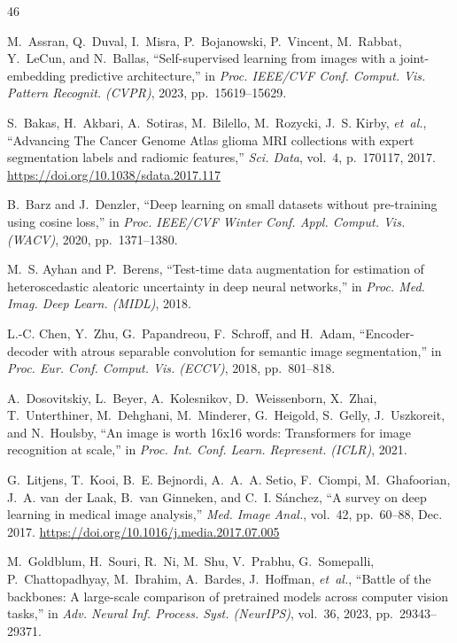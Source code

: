\documentclass[journal]{IEEEtran}
\providecommand{\doi}[1]{\url{https://doi.org/#1}}
\begin{document}
\begin{thebibliography}{46}

M.~Assran, Q.~Duval, I.~Misra, P.~Bojanowski, P.~Vincent, M.~Rabbat, Y.~LeCun, and N.~Ballas, ``Self-supervised learning from images with a joint-embedding predictive architecture,'' in \emph{Proc. IEEE/CVF Conf. Comput. Vis. Pattern Recognit. (CVPR)}, 2023, pp.~15619--15629.

S.~Bakas, H.~Akbari, A.~Sotiras, M.~Bilello, M.~Rozycki, J.~S. Kirby, \emph{et~al.}, ``Advancing The Cancer Genome Atlas glioma MRI collections with expert segmentation labels and radiomic features,'' \emph{Sci. Data}, vol.~4, p.~170117, 2017. \doi{10.1038/sdata.2017.117}

B.~Barz and J.~Denzler, ``Deep learning on small datasets without pre-training using cosine loss,'' in \emph{Proc. IEEE/CVF Winter Conf. Appl. Comput. Vis. (WACV)}, 2020, pp.~1371--1380.

M.~S. Ayhan and P.~Berens, ``Test-time data augmentation for estimation of heteroscedastic aleatoric uncertainty in deep neural networks,'' in \emph{Proc. Med. Imag. Deep Learn. (MIDL)}, 2018.

L.-C. Chen, Y.~Zhu, G.~Papandreou, F.~Schroff, and H.~Adam, ``Encoder-decoder with atrous separable convolution for semantic image segmentation,'' in \emph{Proc. Eur. Conf. Comput. Vis. (ECCV)}, 2018, pp.~801--818.

A.~Dosovitskiy, L.~Beyer, A.~Kolesnikov, D.~Weissenborn, X.~Zhai, T.~Unterthiner, M.~Dehghani, M.~Minderer, G.~Heigold, S.~Gelly, J.~Uszkoreit, and N.~Houlsby, ``An image is worth 16x16 words: Transformers for image recognition at scale,'' in \emph{Proc. Int. Conf. Learn. Represent. (ICLR)}, 2021.

G.~Litjens, T.~Kooi, B.~E. Bejnordi, A.~A.~A. Setio, F.~Ciompi, M.~Ghafoorian, J.~A. van~der Laak, B.~van Ginneken, and C.~I. S{\'a}nchez, ``A survey on deep learning in medical image analysis,'' \emph{Med. Image Anal.}, vol.~42, pp.~60--88, Dec. 2017. \doi{10.1016/j.media.2017.07.005}

M.~Goldblum, H.~Souri, R.~Ni, M.~Shu, V.~Prabhu, G.~Somepalli, P.~Chattopadhyay, M.~Ibrahim, A.~Bardes, J.~Hoffman, \emph{et~al.}, ``Battle of the backbones: A large-scale comparison of pretrained models across computer vision tasks,'' in \emph{Adv. Neural Inf. Process. Syst. (NeurIPS)}, vol.~36, 2023, pp.~29343--29371.


\end{thebibliography}
\end{document}
